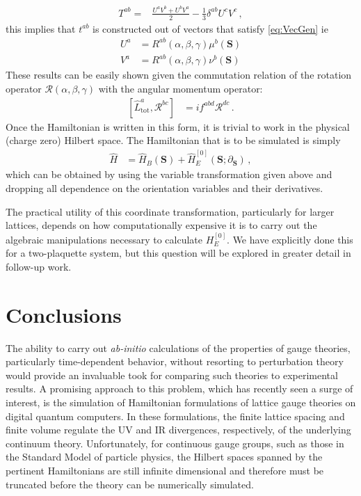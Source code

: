 \documentclass[reprint,superscriptaddress,pra,nofootinbib,preprintnumbers,floatfix]{revtex4-1}
\providecommand{\CR}{\mathcal{R}}
\begin{document}
%
\begin{align}
\label{eq:TensorCriteria}
T^{ab} =& \frac{U^a V^b + U^b V^a}{2}- \frac{1}{3}\delta^{ab}U^c V^c \, ,
\end{align}
this implies that $t^{ab}$ is constructed out of vectors that satisfy \cref{eq:VecGen} ie
\begin{align}
U^a &= R^{ab}(\alpha, \beta, \gamma)\mu^b(\bm S)\nonumber \\
V^a &= R^{ab}(\alpha, \beta, \gamma)\nu^b(\bm S)
\end{align}
%
These results can be easily shown given the commutation relation of the rotation operator $\CR(\alpha, \beta, \gamma)$ with the angular momentum operator:
\begin{align}
\left[\hat L_\text{tot}^a,\CR^{bc}\right] & = i f^{abd}\CR^{d c}
\,.
\end{align}
Once the Hamiltonian is written in this form, it is trivial to work in the physical (charge zero) Hilbert space. 
%
The Hamiltonian that is to be simulated is simply
%
\begin{align}
\hat H &= \hat H_B(\bm S) + \hat H^{[0]}_E(\bm S; \partial_{\bm S})
\,,
\end{align}
%
which can be obtained by using the variable transformation given above and dropping all dependence on the orientation variables and their derivatives.

The practical utility of this coordinate transformation, particularly for larger lattices, depends on how computationally expensive it is to carry out the algebraic manipulations necessary to calculate $H_E^{[0]}$. 
%
We have explicitly done this for a two-plaquette system, but this question will be explored in greater detail in follow-up work.

\section{Conclusions}\label{sec:conclusions}

The ability to carry out \emph{ab-initio} calculations of the properties of gauge theories, particularly time-dependent behavior, without resorting to perturbation theory would provide an invaluable took for comparing such theories to experimental results.  
%
A promising approach to this problem, which has recently seen a surge of interest, is the simulation of Hamiltonian formulations of  lattice gauge theories on digital quantum computers.
%
In these formulations, the  finite lattice spacing and finite volume regulate the UV and IR divergences, respectively, of the underlying continuum theory. 
%
Unfortunately, for continuous gauge groups, such as those in the Standard Model  of particle physics, the Hilbert spaces spanned by the pertinent Hamiltonians are  still infinite dimensional and therefore must be truncated before the theory can be numerically simulated.
%
\end{document}
